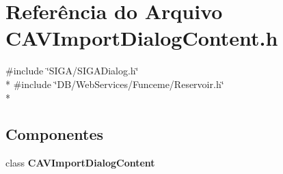 \section{Referência do Arquivo C\+A\+V\+Import\+Dialog\+Content.\+h}
\label{_c_a_v_import_dialog_content_8h}
{\ttfamily \#include \char`\"{}S\+I\+G\+A/\+S\+I\+G\+A\+Dialog.\+h\char`\"{}}\\*
{\ttfamily \#include \char`\"{}D\+B/\+Web\+Services/\+Funceme/\+Reservoir.\+h\char`\"{}}\\*
\subsection*{Componentes}
\begin{DoxyCompactItemize}
\item 
class {\bf C\+A\+V\+Import\+Dialog\+Content}
\end{DoxyCompactItemize}
